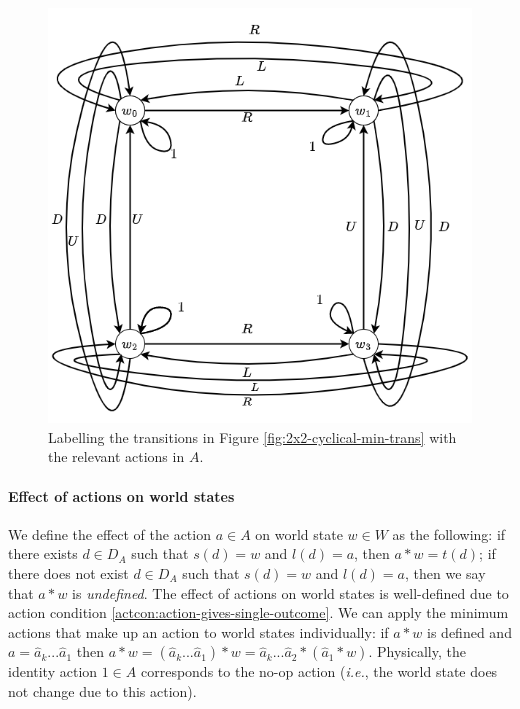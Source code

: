 \begin{figure}
    \centering
    \includegraphics[width=0.5\linewidth]{2MathematicalFramework/InitialFramework/Images/2x2-cyclical-min-actions.drawio.png}
    \caption{Labelling the transitions in Figure \ref{fig:2x2-cyclical-min-trans} with the relevant actions in $A$.}
    \label{fig:2x2-cyclical-min-actions-standard}
\end{figure}

\paragraph{Effect of actions on world states}
We define the effect of the action $a \in A$ on world state $w \in W$ as the following: if there exists $d \in D_{A}$ such that $s(d)=w$ and $l(d)=a$, then $a * w = t(d)$; if there does not exist $d \in D_{A}$ such that $s(d)=w$ and $l(d)=a$, then we say that $a * w$ is \textit{undefined}.
The effect of actions on world states is well-defined due to action condition \ref{actcon:action-gives-single-outcome}.
We can apply the minimum actions that make up an action to world states individually: if $a * w$ is defined and $a = \hat{a}_{k}...\hat{a}_{1}$ then $a * w = (\hat{a}_{k}...\hat{a}_{1}) * w = \hat{a}_{k}...\hat{a}_{2} * (\hat{a}_{1} * w)$.
Physically, the identity action $1 \in A$ corresponds to the no-op action (\textit{i.e.}, the world state does not change due to this action).

